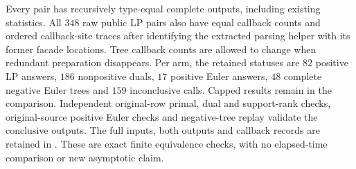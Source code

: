 Every pair has recursively type-equal complete outputs, including existing
statistics.  All $348$ raw public LP pairs also have equal callback counts
and ordered callback-site traces after identifying the extracted parsing
helper with its former facade locations.  Tree callback counts are allowed
to change when redundant preparation disappears.  Per arm, the retained
statuses are $82$ positive LP answers, $186$ nonpositive duals, $17$ positive
Euler answers, $48$ complete negative Euler trees and $159$ inconclusive
calls.  Capped results remain in the comparison.  Independent original-row
primal, dual and support-rank checks, original-source positive Euler checks
and negative-tree replay validate the conclusive outputs.  The full inputs,
both outputs and callback records are retained in
.  These are exact finite
equivalence checks, with no elapsed-time comparison or new asymptotic claim.
